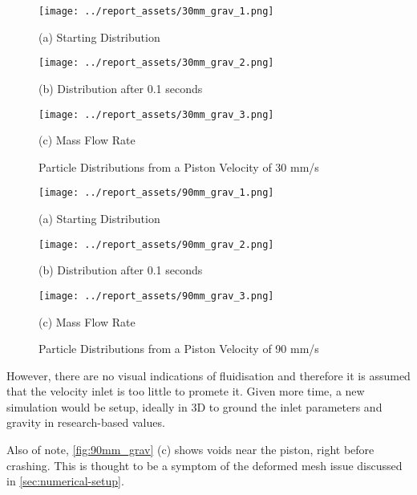 \begin{figure}[htbp]
    \centering

    \begin{minipage}{0.32\textwidth}
        \centering
        \texttt{[image: ../report\_assets/30mm\_grav\_1.png]}
        \caption*{(a) Starting Distribution}
    \end{minipage}
    \hfill
    \begin{minipage}{0.32\textwidth}
        \centering
        \texttt{[image: ../report\_assets/30mm\_grav\_2.png]}
        \caption*{(b) Distribution after 0.1 seconds}
    \end{minipage}
    \hfill
    \begin{minipage}{0.32\textwidth}
        \centering
        \texttt{[image: ../report\_assets/30mm\_grav\_3.png]}
        \caption*{(c) Mass Flow Rate}
    \end{minipage}
    \caption{Particle Distributions from a Piston Velocity of 30 mm/s}

\end{figure}\label{fig:30mm_grav}
\begin{figure}[htbp]
    \centering

    \begin{minipage}{0.32\textwidth}
        \centering
        \texttt{[image: ../report\_assets/90mm\_grav\_1.png]}
        \caption*{(a) Starting Distribution}
    \end{minipage}
    \hfill
    \begin{minipage}{0.32\textwidth}
        \centering
        \texttt{[image: ../report\_assets/90mm\_grav\_2.png]}
        \caption*{(b) Distribution after 0.1 seconds}
    \end{minipage}
    \hfill
    \begin{minipage}{0.32\textwidth}
        \centering
        \texttt{[image: ../report\_assets/90mm\_grav\_3.png]}
        \caption*{(c) Mass Flow Rate}
    \end{minipage}
    \caption{Particle Distributions from a Piston Velocity of 90 mm/s}

\end{figure}\label{fig:90mm_grav}
However, there are no visual indications of fluidisation and therefore it is assumed that the velocity inlet is too little to promete it. Given more time, a new simulation would be setup, ideally in 3D to ground the inlet parameters and gravity in research-based values. 

Also of note, \autoref{fig:90mm_grav} (c) shows voids near the piston, right before crashing. This is thought to be a symptom of the deformed mesh issue discussed in \autoref{sec:numerical-setup}.
